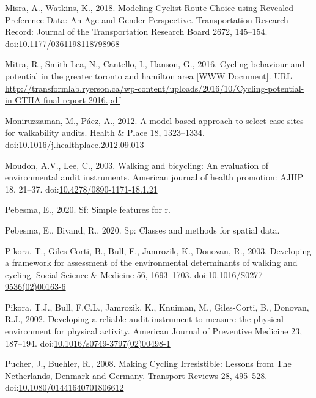 \documentclass[]{elsarticle} %
\begin{document}
\leavevmode\hypertarget{ref-misraModelingCyclistRoute2018}{}%
Misra, A., Watkins, K., 2018. Modeling Cyclist Route Choice using
Revealed Preference Data: An Age and Gender Perspective. Transportation
Research Record: Journal of the Transportation Research Board 2672,
145--154.
doi:\href{https://doi.org/10.1177/0361198118798968}{10.1177/0361198118798968}

\leavevmode\hypertarget{ref-Mitra2016}{}%
Mitra, R., Smith Lea, N., Cantello, I., Hanson, G., 2016. Cycling
behaviour and potential in the greater toronto and hamilton area {[}WWW
Document{]}. URL
\url{http://transformlab.ryerson.ca/wp-content/uploads/2016/10/Cycling-potential-in-GTHA-final-report-2016.pdf}

\leavevmode\hypertarget{ref-moniruzzamanModelbasedApproachSelect2012}{}%
Moniruzzaman, M., Páez, A., 2012. A model-based approach to select case
sites for walkability audits. Health \& Place 18, 1323--1334.
doi:\href{https://doi.org/10.1016/j.healthplace.2012.09.013}{10.1016/j.healthplace.2012.09.013}

\leavevmode\hypertarget{ref-moudonWalkingBicyclingEvaluation2003}{}%
Moudon, A.V., Lee, C., 2003. Walking and bicycling: An evaluation of
environmental audit instruments. American journal of health promotion:
AJHP 18, 21--37.
doi:\href{https://doi.org/10.4278/0890-1171-18.1.21}{10.4278/0890-1171-18.1.21}

\leavevmode\hypertarget{ref-R-sf}{}%
Pebesma, E., 2020. Sf: Simple features for r.

\leavevmode\hypertarget{ref-R-sp}{}%
Pebesma, E., Bivand, R., 2020. Sp: Classes and methods for spatial data.

\leavevmode\hypertarget{ref-pikoraDevelopingFrameworkAssessment2003}{}%
Pikora, T., Giles-Corti, B., Bull, F., Jamrozik, K., Donovan, R., 2003.
Developing a framework for assessment of the environmental determinants
of walking and cycling. Social Science \& Medicine 56, 1693--1703.
doi:\href{https://doi.org/10.1016/S0277-9536(02)00163-6}{10.1016/S0277-9536(02)00163-6}

\leavevmode\hypertarget{ref-pikoraDevelopingReliableAudit2002}{}%
Pikora, T.J., Bull, F.C.L., Jamrozik, K., Knuiman, M., Giles-Corti, B.,
Donovan, R.J., 2002. Developing a reliable audit instrument to measure
the physical environment for physical activity. American Journal of
Preventive Medicine 23, 187--194.
doi:\href{https://doi.org/10.1016/s0749-3797(02)00498-1}{10.1016/s0749-3797(02)00498-1}

\leavevmode\hypertarget{ref-pucherMakingCyclingIrresistible2008}{}%
Pucher, J., Buehler, R., 2008. Making Cycling Irresistible: Lessons from
The Netherlands, Denmark and Germany. Transport Reviews 28, 495--528.
doi:\href{https://doi.org/10.1080/01441640701806612}{10.1080/01441640701806612}
\end{document}
